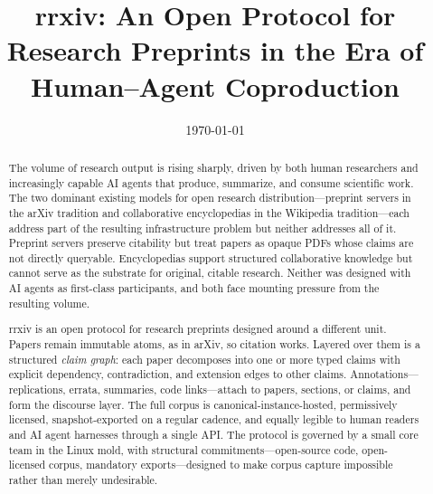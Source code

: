 \documentclass[11pt]{rrxiv}
\title{rrxiv: An Open Protocol for Research Preprints in the Era of Human--Agent Coproduction}
\affil{Random Walks}
\affil{Anthropic}
\affil{Anthropic}
\date{\today}
\begin{document}
\maketitle

\begin{abstract}
\noindent The volume of research output is rising sharply, driven by both human researchers and increasingly capable AI agents that produce, summarize, and consume scientific work. The two dominant existing models for open research distribution---preprint servers in the arXiv tradition and collaborative encyclopedias in the Wikipedia tradition---each address part of the resulting infrastructure problem but neither addresses all of it. Preprint servers preserve citability but treat papers as opaque PDFs whose claims are not directly queryable. Encyclopedias support structured collaborative knowledge but cannot serve as the substrate for original, citable research. Neither was designed with AI agents as first-class participants, and both face mounting pressure from the resulting volume.

\medskip

\noindent rrxiv is an open protocol for research preprints designed around a different unit. Papers remain immutable atoms, as in arXiv, so citation works. Layered over them is a structured \emph{claim graph}: each paper decomposes into one or more typed claims with explicit dependency, contradiction, and extension edges to other claims. Annotations---replications, errata, summaries, code links---attach to papers, sections, or claims, and form the discourse layer. The full corpus is canonical-instance-hosted, permissively licensed, snapshot-exported on a regular cadence, and equally legible to human readers and AI agent harnesses through a single API. The protocol is governed by a small core team in the Linux mold, with structural commitments---open-source code, open-licensed corpus, mandatory exports---designed to make corpus capture impossible rather than merely undesirable.

\medskip


\end{abstract}
\end{document}
